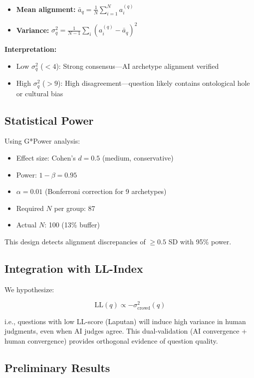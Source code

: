 \documentclass[11pt,a4paper]{article}
\theoremstyle{definition}
\theoremstyle{remark}
\begin{document}
\begin{itemize}
\item \textbf{Mean alignment:} $\bar{a}_q = \frac{1}{N} \sum_{i=1}^N a_i^{(q)}$
\item \textbf{Variance:} $\sigma_q^2 = \frac{1}{N-1} \sum_i (a_i^{(q)} - \bar{a}_q)^2$
\end{itemize}

\textbf{Interpretation:}
\begin{itemize}
\item Low $\sigma_q^2$ ($< 4$): Strong consensus—AI archetype alignment verified
\item High $\sigma_q^2$ ($> 9$): High disagreement—question likely contains 
ontological hole or cultural bias
\end{itemize}

\subsection{Statistical Power}

Using G*Power analysis:
\begin{itemize}
\item Effect size: Cohen's $d = 0.5$ (medium, conservative)
\item Power: $1 - \beta = 0.95$
\item $\alpha = 0.01$ (Bonferroni correction for 9 archetypes)
\item Required $N$ per group: 87
\item Actual $N$: 100 (13\% buffer)
\end{itemize}

This design detects alignment discrepancies of $\geq 0.5$ SD with 95\% power.

\subsection{Integration with LL-Index}

We hypothesize:

\[
\text{LL}(q) \propto -\sigma_{\text{crowd}}^2(q)
\]

i.e., questions with low LL-score (Laputan) will induce high variance in human 
judgments, even when AI judges agree. This dual-validation (AI convergence + 
human convergence) provides orthogonal evidence of question quality.

\subsection{Preliminary Results}
\end{document}
